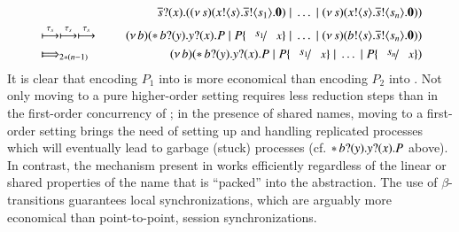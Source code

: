 \documentclass[runningheads]{llncs}
\begin{document}
{\begin{eqnarray*}
& & \qquad \qquad \binp{\dual{s}}{x} (\newsp{s}{\bout{x}{s} \bout{\dual{s}}{s_1} \inact} \Par \dots \Par \newsp{s}{\bout{x}{s} \bout{\dual{s}}{s_n}\inact})
	\\
	& \hby{\stau}  \hby{\stau} \hby{\stau} & 
	\newsp{b}{\repl \binp{b}{y} \binp{y}{x} P \Par P\subst{s_1}{x} \Par \dots \Par \newsp{s}{\bout{b}{s} \bout{\dual{s}}{s_n} \inact}}
	\\
	& \Hby{}_{2*(n - 1)} & 
	\newsp{b}{\repl \binp{b}{y} \binp{y}{x} P \Par P\subst{s_1}{x} \Par \dots \Par P\subst{s_n}{x}}
\end{eqnarray*}
It is clear that encoding $P_1$ into \HO is more economical than 
encoding $P_2$ into \sessp. Not only moving to a pure higher-order setting requires less reduction steps than in the first-order concurrency of \sessp; in the presence of shared names, moving to a first-order setting brings the need of setting up and handling replicated processes which will eventually lead to garbage (stuck) processes (cf. $\ast\, b ? (y) . y ? (x) . P$ above). In contrast, the mechanism present in \HO works efficiently regardless of the linear or shared properties of the name that is ``packed'' into the abstraction. 
The use of $\beta$-transitions guarantees local synchronizations, which are arguably more economical than point-to-point, session synchronizations.

}
\end{document}
